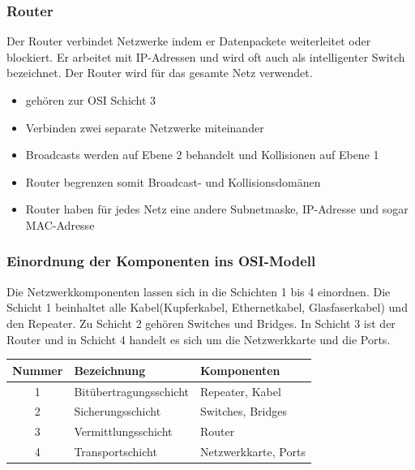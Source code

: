 \documentclass[12pt,a4paper]{article}
\begin{document}
		\subsubsection{Router}
			Der Router verbindet Netzwerke indem er Datenpackete weiterleitet oder blockiert. Er arbeitet mit IP-Adressen und wird oft auch als intelligenter Switch bezeichnet. Der Router wird für das gesamte Netz verwendet.
			\begin{center}
			\end{center}
			\begin{itemize}
				\item gehören zur OSI Schicht 3
				\item Verbinden zwei separate Netzwerke miteinander
				\item Broadcasts werden auf Ebene 2 behandelt und Kollisionen auf Ebene 1
				\item Router begrenzen somit Broadcast- und Kollisionsdomänen
				\item Router haben für jedes Netz eine andere Subnetmaske, IP-Adresse und sogar MAC-Adresse
			\end{itemize}
		
		\subsubsection{Einordnung der Komponenten ins OSI-Modell}
			Die Netzwerkkomponenten lassen sich in die Schichten 1 bis 4 einordnen. Die Schicht 1 beinhaltet alle Kabel(Kupferkabel, Ethernetkabel, Glasfaserkabel) und den Repeater. Zu Schicht 2 gehören Switches und Bridges. In Schicht 3 ist der Router und in Schicht 4 handelt es sich um die Netzwerkkarte und die Ports.
			\begin{center}
				\renewcommand{\arraystretch}{1.5}
					\begin{tabularx}{17cm}{|c|X|X|}
						\hline
						\cellcolor{cyan!60!white}\textbf{Nummer} & \cellcolor{cyan!60!white}\textbf{Bezeichnung} & \cellcolor{cyan!60!white}\textbf{Komponenten}\\
						\hline
						1 & Bitübertragungsschicht & Repeater, Kabel\\
						\hline
						2 & Sicherungsschicht & Switches, Bridges\\
						\hline
						3 & Vermittlungsschicht & Router\\
						\hline
						4 & Transportschicht & Netzwerkkarte, Ports\\
						\hline
					\end{tabularx}
			\end{center}
		
\end{document}
